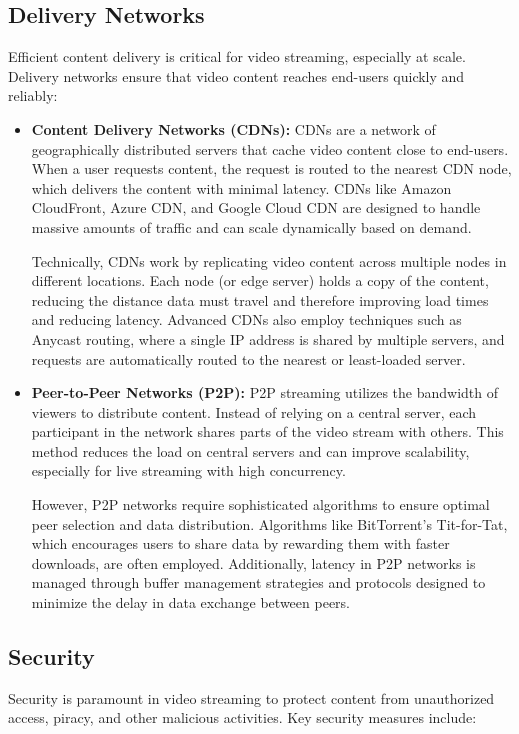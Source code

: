 \subsection{Delivery Networks}
Efficient content delivery is critical for video streaming, especially at scale. Delivery networks ensure that video content reaches end-users quickly and reliably:

\begin{itemize}
    \item \textbf{Content Delivery Networks (CDNs):} CDNs are a network of geographically distributed servers that cache video content close to end-users. When a user requests content, the request is routed to the nearest CDN node, which delivers the content with minimal latency. CDNs like Amazon CloudFront, Azure CDN, and Google Cloud CDN are designed to handle massive amounts of traffic and can scale dynamically based on demand\cite{cdn_tech}.
    
    Technically, CDNs work by replicating video content across multiple nodes in different locations. Each node (or edge server) holds a copy of the content, reducing the distance data must travel and therefore improving load times and reducing latency. Advanced CDNs also employ techniques such as Anycast routing, where a single IP address is shared by multiple servers, and requests are automatically routed to the nearest or least-loaded server\cite{cdn_anycast}.
    
    \item \textbf{Peer-to-Peer Networks (P2P):} P2P streaming utilizes the bandwidth of viewers to distribute content. Instead of relying on a central server, each participant in the network shares parts of the video stream with others. This method reduces the load on central servers and can improve scalability, especially for live streaming with high concurrency\cite{p2p_cdn}.

    However, P2P networks require sophisticated algorithms to ensure optimal peer selection and data distribution. Algorithms like BitTorrent's Tit-for-Tat, which encourages users to share data by rewarding them with faster downloads, are often employed. Additionally, latency in P2P networks is managed through buffer management strategies and protocols designed to minimize the delay in data exchange between peers\cite{p2p_latency}.
\end{itemize}

\subsection{Security}
Security is paramount in video streaming to protect content from unauthorized access, piracy, and other malicious activities. Key security measures include:

